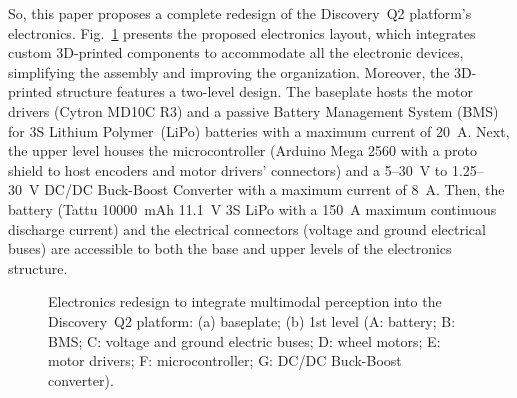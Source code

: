 \documentclass[letterpaper,10pt,conference]{IEEEtran} %
\def\figref#1{Fig.~\ref{#1}}
\begin{document}
So, this paper proposes a complete redesign of the
Discovery~Q2 platform's electronics.
\figref{fig:electronics} presents the proposed electronics layout,
which integrates custom 3D-printed components to accommodate all the
electronic devices,
simplifying the assembly and improving the organization.
Moreover, the 3D-printed structure features a two-level design.
The baseplate hosts the motor drivers (Cytron MD10C R3)
and a passive Battery Management System (BMS)
for 3S Lithium Polymer~(LiPo) batteries with a maximum current of 20~A.
Next, the upper level houses the microcontroller
(Arduino Mega 2560 with a proto shield to host encoders and 
motor drivers' connectors)
and a 5--30~V to 1.25--30~V DC/DC Buck-Boost Converter with a 
maximum current of 8~A.
Then, the battery (Tattu 10000~mAh 11.1~V 3S LiPo
with a 150~A maximum continuous discharge current)
and the electrical connectors (voltage and ground electrical buses)
are accessible to both the base and upper levels of the electronics structure.

\begin{figure}[t]
\centering
{}
\linebreak
{}
\caption{Electronics redesign to integrate multimodal perception into
the Discovery~Q2 platform:
(a) baseplate;
(b) 1st level
(A: battery; B: BMS; C: voltage and ground electric buses; D: wheel motors;
E: motor drivers; F: microcontroller; G: DC/DC Buck-Boost converter).}
\label{fig:electronics}
\end{figure}
\end{document}
